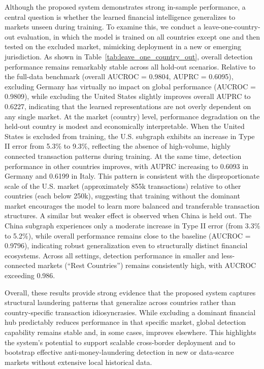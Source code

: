 \documentclass[11pt,english]{article}
\begin{document}
Although the proposed system demonstrates strong in-sample performance, a central question is whether the learned financial intelligence generalizes to markets unseen during training. To examine this, we conduct a leave-one-country-out evaluation, in which the model is trained on all countries except one and then tested on the excluded market, mimicking deployment in a new or emerging jurisdiction. As shown in Table~\ref{tab:leave_one_country_out}, overall detection performance remains remarkably stable across all hold-out scenarios. Relative to the full-data benchmark (overall AUCROC = 0.9804, AUPRC = 0.6095), excluding Germany has virtually no impact on global performance (AUCROC = 0.9809), while excluding the United States slightly improves overall AUPRC to 0.6227, indicating that the learned representations are not overly dependent on any single market. At the market (country) level, performance degradation on the held-out country is modest and economically interpretable. When the United States is excluded from training, the U.S. subgraph exhibits an increase in Type II error from 5.3\% to 9.3\%, reflecting the absence of high-volume, highly connected transaction patterns during training. At the same time, detection performance in other countries improves, with AUPRC increasing to 0.6093 in Germany and 0.6199 in Italy. This pattern is consistent with the disproportionate scale of the U.S. market (approximately 855k transactions) relative to other countries (each below 250k), suggesting that training without the dominant market encourages the model to learn more balanced and transferable transaction structures. A similar but weaker effect is observed when China is held out. The China subgraph experiences only a moderate increase in Type II error (from 3.3\% to 5.2\%), while overall performance remains close to the baseline (AUCROC = 0.9796), indicating robust generalization even to structurally distinct financial ecosystems. Across all settings, detection performance in smaller and less-connected markets (“Rest Countries”) remains consistently high, with AUCROC exceeding 0.986. 

Overall, these results provide strong evidence that the proposed system captures structural laundering patterns that generalize across countries rather than country-specific transaction idiosyncrasies. While excluding a dominant financial hub predictably reduces performance in that specific market, global detection capability remains stable and, in some cases, improves elsewhere. This highlights the system’s potential to support scalable cross-border deployment and to bootstrap effective anti-money-laundering detection in new or data-scarce markets without extensive local historical data.
\end{document}

